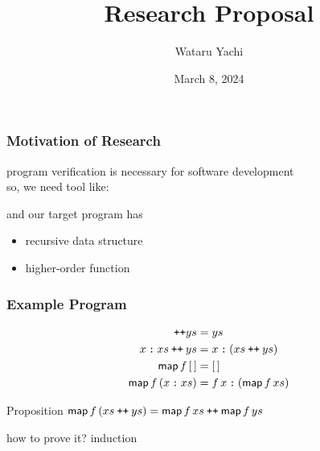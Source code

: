 \documentclass[12pt,aspectratio=169]{beamer}
\title{ Research Proposal }
\author{Wataru Yachi}
\institute{JAIST}
\date{March 8, 2024}
\newcommand{\m}[1]{\mathsf{#1}}
\newcommand\catenate{\mathbin{\text{\ttfamily\upshape ++}}}
\newcommand\cons{\mathbin{\text{\ttfamily\upshape :}}}
\begin{document}
\maketitle

\begin{frame}
    \frametitle{Motivation of Research}
    program verification is necessary for software development\\
    so, we need tool like:
    \begin{figure}
        \centering
    \end{figure}
    and our target program has
    \begin{itemize}
        \item recursive data structure
        \item higher-order function
    \end{itemize}
\end{frame}

\newcommand{\map}{\m{map}}
\newcommand{\nil}{[\,]}

\begin{frame}
    \frametitle{Example Program}
    \begin{example}
            \setlength{\abovedisplayskip}{0pt}
            \setlength{\belowdisplayskip}{0pt}
        \begin{align*}
            \nil \catenate ys &= ys\\
            x\cons xs \catenate ys &= x \cons (xs \catenate ys)\\
            \map\,f\,\nil &= \nil\\
            \map\,f\,(x\cons xs) &= f\,x \cons (\map\,f\,xs)\\
        \end{align*}
        \vspace{-20pt}
    \begin{block}{Proposition}
        $\m{map}\,f\,(xs \catenate ys) = \m{map} \, f \, xs \catenate \m{map}\,f\,ys$
    \end{block}
        how to prove it? \quad \alert{induction}
    \end{example}
\end{frame}
\end{document}
